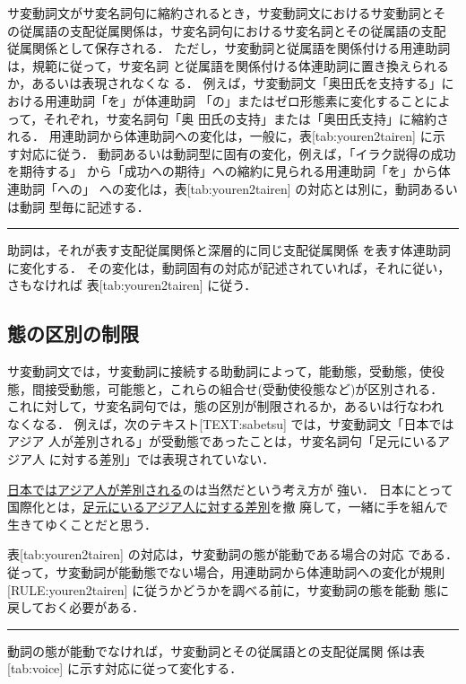 サ変動詞文がサ変名詞句に縮約されるとき，サ変動詞文におけるサ変動詞とそ
の従属語の支配従属関係は，サ変名詞句におけるサ変名詞とその従属語の支配
従属関係として保存される．
ただし，サ変動詞と従属語を関係付ける用連助詞は，規範に従って，サ変名詞
と従属語を関係付ける体連助詞に置き換えられるか，あるいは表現されなくな
る．
例えば，サ変動詞文「奥田氏を支持する」における用連助詞「を」が体連助詞
「の」またはゼロ形態素に変化することによって，それぞれ，サ変名詞句「奥
田氏の支持」または「奥田氏支持」に縮約される．
用連助詞から体連助詞への変化は，一般に，表[tab:youren2tairen] に示
す対応に従う．
動詞あるいは動詞型に固有の変化，例えば，「イラク説得の成功を期待する」
から「成功への期待」への縮約に見られる用連助詞「を」から体連助詞「への」
への変化は，表[tab:youren2tairen] の対応とは別に，動詞あるいは動詞
型毎に記述する．
\begin{RULE}
\rule 用連助詞は，それが表す支配従属関係と深層的に同じ支配従属関係
\footnotemark
を表す体連助詞に変化する．
その変化は，動詞固有の対応が記述されていれば，それに従い，さもなければ
表[tab:youren2tairen] に従う．\label{RULE:youren2tairen}
\end{RULE}


\subsection{態の区別の制限}

サ変動詞文では，サ変動詞に接続する助動詞によって，能動態，受動態，使役
態，間接受動態，可能態と，これらの組合せ(受動使役態など)が区別される．
これに対して，サ変名詞句では，態の区別が制限されるか，あるいは行なわれ
なくなる．
例えば，次のテキスト[TEXT:sabetsu] では，サ変動詞文「日本ではアジア
人が差別される」が受動態であったことは，サ変名詞句「足元にいるアジア人
に対する差別」では表現されていない．
\begin{TEXT}
\text \underline{日本ではアジア人が差別される}のは当然だという考え方が
強い．
日本にとって国際化とは，\underline{足元にいるアジア人に対する差別}を撤
廃して，一緒に手を組んで生きてゆくことだと思う．\label{TEXT:sabetsu}
\end{TEXT}

表[tab:youren2tairen] の対応は，サ変動詞の態が能動である場合の対応
である．
従って，サ変動詞が能動態でない場合，用連助詞から体連助詞への変化が規則
[RULE:youren2tairen] に従うかどうかを調べる前に，サ変動詞の態を能動
態に戻しておく必要がある．
\begin{RULE}
\rule サ変動詞の態が能動でなければ，サ変動詞とその従属語との支配従属関
係は表[tab:voice] に示す対応に従って変化する．\label{RULE:voice}
\end{RULE}


